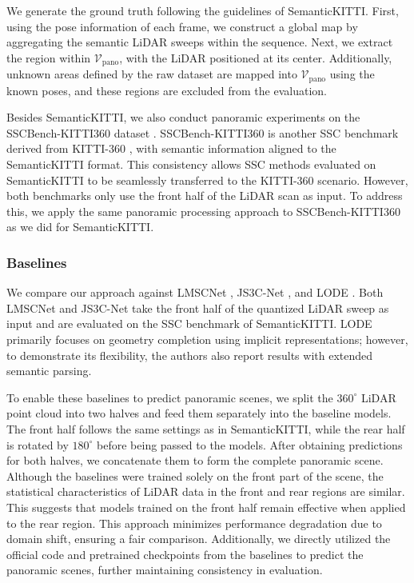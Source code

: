 \documentclass[conference]{IEEEtran}
\begin{document}
We generate the ground truth following the guidelines of SemanticKITTI.
First, using the pose information of each frame, we construct a global map by aggregating the semantic LiDAR sweeps within the sequence.
Next, we extract the region within $\mathcal{V}_\mathrm{pano}$, with the LiDAR positioned at its center.
Additionally, unknown areas defined by the raw dataset are mapped into $\mathcal{V}_\mathrm{pano}$ using the known poses, and these regions are excluded from the evaluation.

Besides SemanticKITTI, we also conduct panoramic experiments on the SSCBench-KITTI360 dataset \cite{vzyrianov2024}.
SSCBench-KITTI360 is another SSC benchmark derived from KITTI-360 \cite{ylia}, with semantic information aligned to the SemanticKITTI format.
This consistency allows SSC methods evaluated on SemanticKITTI to be seamlessly transferred to the KITTI-360 scenario.
However, both benchmarks only use the front half of the LiDAR scan as input.
To address this, we apply the same panoramic processing approach to SSCBench-KITTI360 as we did for SemanticKITTI.

\subsubsection{Baselines}

We compare our approach against LMSCNet \cite{jbehley2011}, JS3C-Net \cite{hzeng2025}, and LODE \cite{wwu2025}.
Both LMSCNet and JS3C-Net take the front half of the quantized LiDAR sweep as input and are evaluated on the SSC benchmark of SemanticKITTI.
LODE primarily focuses on geometry completion using implicit representations; however, to demonstrate its flexibility, the authors also report results with extended semantic parsing.

To enable these baselines to predict panoramic scenes, we split the $360^\circ$ LiDAR point cloud into two halves and feed them separately into the baseline models.
The front half follows the same settings as in SemanticKITTI, while the rear half is rotated by $180^\circ$ before being passed to the models.
After obtaining predictions for both halves, we concatenate them to form the complete panoramic scene.
Although the baselines were trained solely on the front part of the scene, the statistical characteristics of LiDAR data in the front and rear regions are similar.
This suggests that models trained on the front half remain effective when applied to the rear region.
This approach minimizes performance degradation due to domain shift, ensuring a fair comparison.
Additionally, we directly utilized the official code and pretrained checkpoints from the baselines to predict the panoramic scenes, further maintaining consistency in evaluation.
\end{document}
